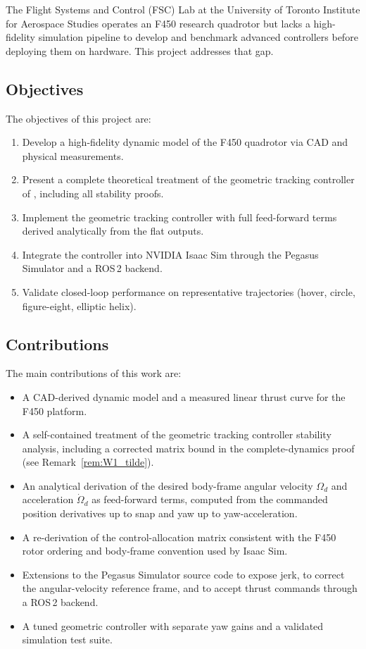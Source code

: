 \documentclass[11pt]{article}
\theoremstyle{remark}
\begin{document}
The Flight Systems and Control (FSC) Lab at the University of Toronto Institute for Aerospace Studies operates an F450 research quadrotor but lacks a high-fidelity simulation pipeline to develop and benchmark advanced controllers before deploying them on hardware. This project addresses that gap.

\subsection{Objectives}
The objectives of this project are:
\begin{enumerate}[label=(\roman*)]
    \item Develop a high-fidelity dynamic model of the F450 quadrotor via CAD and physical measurements.
    \item Present a complete theoretical treatment of the geometric tracking controller of \cite{Lee2010CDC}, including all stability proofs.
    \item Implement the geometric tracking controller with full feed-forward terms derived analytically from the flat outputs.
    \item Integrate the controller into NVIDIA Isaac Sim through the Pegasus Simulator and a ROS\,2 backend.
    \item Validate closed-loop performance on representative trajectories (hover, circle, figure-eight, elliptic helix).
\end{enumerate}

\subsection{Contributions}
The main contributions of this work are:
\begin{itemize}
    \item A CAD-derived dynamic model and a measured linear thrust curve for the F450 platform.
    \item A self-contained treatment of the geometric tracking controller stability analysis, including a corrected matrix bound in the complete-dynamics proof (see Remark~\ref{rem:W1_tilde}).
    \item An analytical derivation of the desired body-frame angular velocity $\Omega_d$ and acceleration $\dot\Omega_d$ as feed-forward terms, computed from the commanded position derivatives up to snap and yaw up to yaw-acceleration.
    \item A re-derivation of the control-allocation matrix consistent with the F450 rotor ordering and body-frame convention used by Isaac Sim.
    \item Extensions to the Pegasus Simulator source code to expose jerk, to correct the angular-velocity reference frame, and to accept thrust commands through a ROS\,2 backend.
    \item A tuned geometric controller with separate yaw gains and a validated simulation test suite.
\end{itemize}
\end{document}
